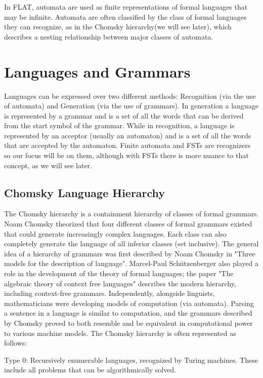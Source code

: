 In FLAT, automata are used as finite representations of formal languages that may be infinite. 
Automata are often classified by the class of formal languages they can recognize, 
as in the Chomsky hierarchy(we will see later), which describes a nesting relationship between major classes of automata.

\section{Languages and Grammars}

Languages can be expressed over two different methods:
Recognition (via the use of automata) and Generation (via the use of grammars). 
In generation a language is represented by a grammar and is a set of all the words that can be derived from the start symbol of the grammar. 
While in recognition, a language is represented by an acceptor (usually an automaton) and is a set of all the words that are accepted by the automaton.
Finite automata and FSTs are recognizers so our focus will be on them, although with FSTs there is more nuance to that concept, as we will see later.

\subsection{Chomsky Language Hierarchy}

The Chomsky hierarchy\cite{chomsky_hierarchy} is a containment hierarchy of classes of formal grammars. 
Noam Chomsky theorized that four different classes of formal grammars existed that could generate increasingly complex languages. 
Each class can also completely generate the language of all inferior classes (set inclusive).
The general idea of a hierarchy of grammars was first described by Noam Chomsky in "Three models for the description of language".
Marcel-Paul Schützenberger also played a role in the development of the theory of formal languages; 
the paper "The algebraic theory of context free languages" describes the modern hierarchy, including context-free grammars.
Independently, alongside linguists, mathematicians were developing models of computation (via automata). 
Parsing a sentence in a language is similar to computation, 
and the grammars described by Chomsky proved to both resemble and be equivalent in computational power to various machine models.
The Chomsky hierarchy is often represented as follows:

    Type 0: Recursively enumerable languages, recognized by Turing machines. These include all problems that can be algorithmically solved.


